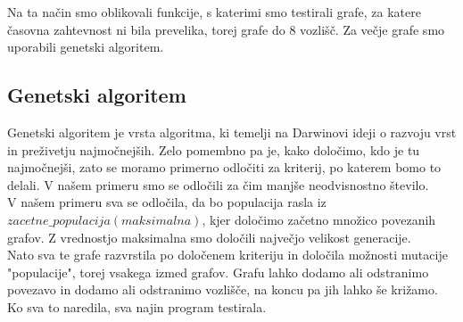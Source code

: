 \documentclass[12pt,a4paper]{amsart}
\theoremstyle{definition} %
\theoremstyle{plain} %
\begin{document}
Na ta način smo oblikovali funkcije, s katerimi smo testirali grafe, za katere časovna zahtevnost ni bila prevelika, torej grafe do $8$ vozlišč. Za večje grafe smo uporabili genetski algoritem.
\subsection{Genetski algoritem}

Genetski algoritem je vrsta algoritma, ki temelji na Darwinovi ideji o razvoju vrst in preživetju najmočnejših. Zelo pomembno pa je, kako določimo, kdo je tu najmočnejši, zato se moramo primerno odločiti za kriterij, po katerem bomo to delali. V našem primeru smo se odločili za čim manjše neodvisnostno število.\\

V našem primeru sva se odločila, da bo populacija rasla iz $zacetne\_populacija(maksimalna)$, kjer določimo začetno množico povezanih grafov. Z vrednostjo maksimalna smo določili največjo velikost generacije.\\
Nato sva te grafe razvrstila po določenem kriteriju in določila možnosti mutacije "populacije", torej vsakega izmed grafov. Grafu lahko dodamo ali odstranimo povezavo in dodamo ali odstranimo vozlišče, na koncu pa jih lahko še križamo.\\
Ko sva to naredila, sva najin program testirala.
\end{document}
